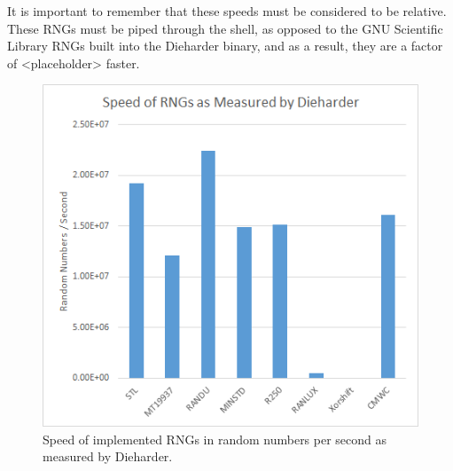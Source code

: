 It is important to remember that these speeds must be considered to be relative. These RNGs must be piped through the shell, as opposed to the GNU Scientific Library RNGs built into the Dieharder binary, and as a result, they are a factor of <placeholder> faster.

\begin{figure}[tb]
    \begin{center}
        \includegraphics[width=\linewidth]{figures/speed.png}
    \end{center}
    \caption{Speed of implemented RNGs in random numbers per second as measured by Dieharder.}
    \label{fig:speed}
\end{figure}


